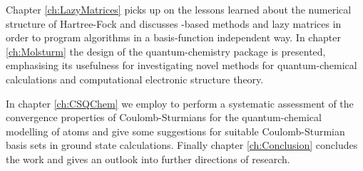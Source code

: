 Chapter \ref{ch:LazyMatrices}
picks up on the lessons learned about the numerical structure
of Hartree-Fock and discusses
\contraction-based methods and lazy matrices
in order to program algorithms
in a basis-function independent way.
In chapter \ref{ch:Molsturm} the design of the quantum-chemistry
package \molsturm is presented,
emphasising its usefulness for investigating novel methods
for quantum-chemical calculations
and computational electronic structure theory.

In chapter \ref{ch:CSQChem} we employ \molsturm
to perform a systematic assessment of
the convergence properties of Coulomb-Sturmians
for the quantum-chemical modelling of atoms
and give some suggestions for suitable Coulomb-Sturmian basis sets
in ground state calculations.
Finally chapter \ref{ch:Conclusion} concludes the work and gives
an outlook into further directions of research.
